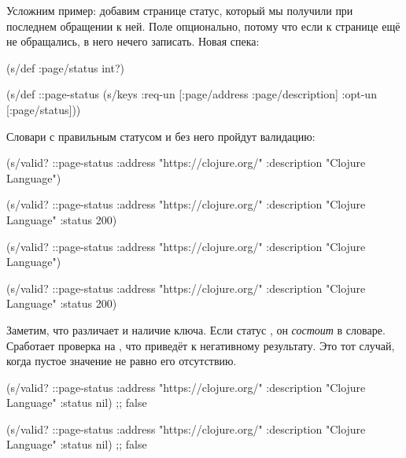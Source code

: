 \fi

Усложним пример: добавим странице статус, который мы получили при
последнем обращении к ней. Поле опционально, потому что если к странице ещё не
обращались, в него нечего записать. Новая спека:

\begin{clojure}
(s/def :page/status int?)

(s/def ::page-status
  (s/keys :req-un [:page/address
                   :page/description]
          :opt-un [:page/status]))
\end{clojure}

Словари с правильным статусом и без него пройдут валидацию:

\ifnarrow

\begin{clojure}
(s/valid? ::page-status
  {:address "https://clojure.org/"
   :description "Clojure Language"})

(s/valid? ::page-status
  {:address "https://clojure.org/"
   :description "Clojure Language"
   :status 200})
\end{clojure}

\else

\begin{clojure}
(s/valid? ::page-status
          {:address "https://clojure.org/"
           :description "Clojure Language"})

(s/valid? ::page-status
          {:address "https://clojure.org/"
           :description "Clojure Language"
           :status 200})
\end{clojure}

\fi


Заметим, что  различает  и наличие ключа. Если статус
, он \emph{состоит} в словаре. Сработает проверка  на
, что приведёт к негативному результату. Это тот случай, когда пустое
значение не равно его отсутствию.

\ifnarrow

\begin{clojure}
(s/valid? ::page-status
  {:address "https://clojure.org/"
   :description "Clojure Language"
   :status nil})
;; false
\end{clojure}

\else

\begin{clojure}
(s/valid? ::page-status
          {:address "https://clojure.org/"
           :description "Clojure Language"
           :status nil})
;; false
\end{clojure}

